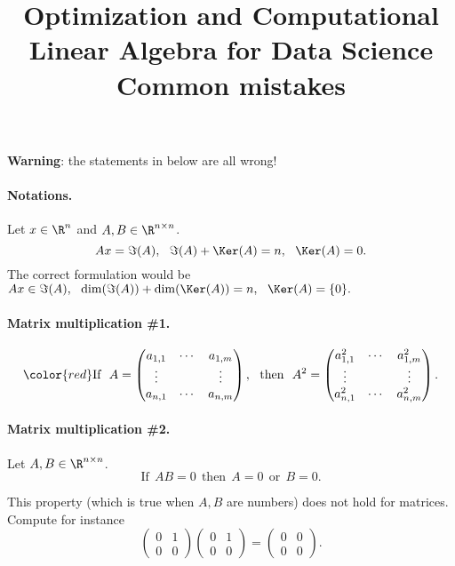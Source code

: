 \documentclass[11pt,nocut]{article}
\title{\vspace{-2.0cm}%
	Optimization and Computational Linear Algebra for Data Science\\
Common mistakes}
\date{}
\begin{document}
\maketitle

\begin{center}
\textbf{Warning}: the statements in {\color{red}{red}} below are all wrong!
\end{center}
\vspace{2mm}

\paragraph{Notations.} Let $x \in \R^n$ and $A,B \in \R^{n \times n}$.
{\color{red}
	$$
	Ax = \Im(A), \ \ \Im(A) + \Ker(A) = n, \ \ \Ker(A) = 0.
	$$
}
The correct formulation would be $
Ax \in \Im(A), \ \ \dim(\Im(A)) + \dim(\Ker(A)) = n, \ \ \Ker(A) = \{0\}.
$
\paragraph{Matrix multiplication \#1.}
$$
{\color{red}
	\text{If} \ \
	A = 
	\begin{pmatrix}
		a_{1,1} & \cdots & a_{1,m} \\
		\vdots & & \vdots \\
		a_{n,1} & \cdots & a_{n,m}
	\end{pmatrix},
	\ \ \text{then} \ \
	A^2
	=
	\begin{pmatrix}
		a_{1,1}^2 & \cdots & a_{1,m}^2 \\
		\vdots & & \vdots \\
		a_{n,1}^2 & \cdots & a_{n,m}^2
	\end{pmatrix}.
}
$$

\paragraph{Matrix multiplication \#2.}
Let $A,B \in \R^{n \times n}$.
{\color{red}
	$$
	\text{If} \ \ AB=0 \ \ \text{then} \ \ A=0 \ \ \text{or} \ \ B=0.
	$$
}

This property (which is true when $A,B$ are numbers) does not hold for matrices. Compute for instance
$$
\begin{pmatrix}
	0 & 1 \\
	0 & 0 
\end{pmatrix}
\begin{pmatrix}
	0 & 1 \\
	0 & 0 
\end{pmatrix}
=
\begin{pmatrix}
	0 & 0 \\
	0 & 0 
\end{pmatrix}.
$$
\end{document}
